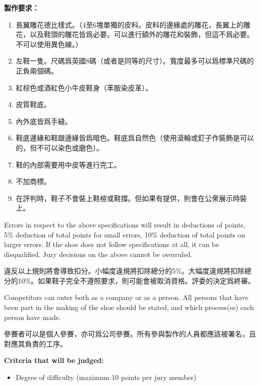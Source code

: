 \begin{paracol}{2}
        \switchcolumn
        \textbf{製作要求：}
        \begin{enumerate}
            \item 長翼雕花德比樣式。（4至6塊單獨的皮料。皮料的邊緣處的雕花，長翼上的雕花，以及鞋頭的雕花皆爲必要。可以進行額外的雕花和裝飾，但這不爲必要。不可以使用異色線。）
            \item 左鞋一隻。尺碼爲英國8碼（或者是同等的尺寸）。寬度最多可以爲標準尺碼的正負兩個碼。
            \item 紅棕色或酒紅色小牛皮鞋身（苯胺染皮革）。
            \item 皮質鞋底。
            \item 內外底皆爲手縫。
            \item 鞋底邊緣和鞋跟邊緣皆爲暗色。鞋底爲自然色（使用滾輪或釘子作裝飾是可以的，但不可以染色或磨色）。
            \item 鞋的內部需要用中皮等進行完工。
            \item 不加商標。
            \item 在評判時，鞋子不會裝上鞋楦或鞋撐。但如果有提供，則會在公衆展示時裝上。
        \end{enumerate}
        \switchcolumn*

        Errors in respect to the above specifications will result in deductions of points, 5\% deduction of total points for small errors, 10\% deduction of total points on larger errors. If the shoe does not follow specifications at all, it can be disqualified. Jury decisions on the above cannot be overruled.

        \switchcolumn
        違反以上規則將會導致扣分。小幅度違規將扣除總分的5\%。大幅度違規將扣除總分的10\%。如果鞋子完全不遵照要求，則可能會被取消資格。評委的決定爲終審。
        \switchcolumn*

        Competitors can enter both as a company or as a person. All persons that have been part in the making of the shoe should be stated, and which process(es) each person have made.

        \vspace{1em}

        \switchcolumn
        參賽者可以是個人參賽，亦可爲公司參賽。所有參與製作的人員都應該被署名，且對應其負責的工序。
        \switchcolumn*

        \textbf{Criteria that will be judged:}
        \begin{itemize}
            \item Degree of difficulty (maximum 10 points per jury member)


\end{itemize}
\end{paracol}
